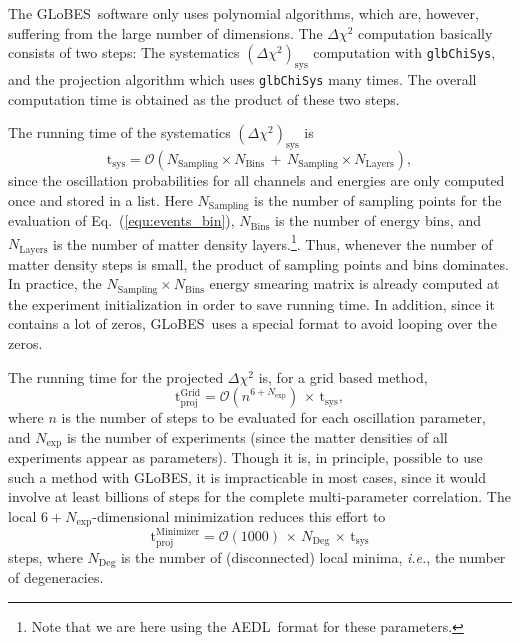 \documentclass[12pt,a4paper]{article}
\newcommand{\ie}{{\it i.e.}}
\newcommand{\eq}{Eq.}
\newcommand{\GLOBES}{{\sf GLoBES}}
\newcommand{\AEDL}{{\sf AEDL}}
\newcommand{\equ}[1]{\eq~(\ref{equ:#1})}
\begin{document}
The \GLOBES\ software only uses polynomial algorithms, which are,
however, suffering from the large number of dimensions.
The $\Delta \chi^2$ computation basically consists of two steps:
The systematics $(\Delta \chi^2)_{\mathrm{sys}}$ computation with {\tt glbChiSys},
and the projection algorithm which uses {\tt glbChiSys} many times. 
The overall computation time is obtained as the product of these two steps.

The running time of the systematics $(\Delta \chi^2)_{\mathrm{sys}}$ 
is 
\begin{equation}
\mathrm{t_{sys}} = \mathcal{O} \left( N_{\mathrm{Sampling}} \times N_{\mathrm{Bins}}  \, + \, N_{\mathrm{Sampling}} \times N_{\mathrm{Layers}} \right) ,
\end{equation}
since the oscillation probabilities for all channels and energies
are only computed once and stored in a list. Here $N_{\mathrm{Sampling}}$ is the number of sampling points for the evaluation of \equ{events_bin}, $N_{\mathrm{Bins}}$ is the number of energy bins,
and $N_{\mathrm{Layers}}$ is the number of matter density layers.\footnote{Note that we are here using the \AEDL\ format for these
parameters.}. Thus, whenever the
number of matter density steps is small, the product of sampling points
and bins dominates. In practice, the $N_{\mathrm{Sampling}} \times N_{\mathrm{Bins}}$ energy smearing matrix is already computed at 
the experiment initialization in order to save running time. In addition,
since it contains a lot of zeros, \GLOBES\ uses a special format to
avoid looping over the zeros.

The running time for the projected $\Delta \chi^2$ is, for a grid based method,
\begin{equation}
 \mathrm{t_{proj}^{Grid}} = \mathcal{O}\left( n^{6+N_{\mathrm{exp}}}\right) \, \times \, \mathrm{t_{sys}},
\end{equation}
where $n$ is the number of steps to be evaluated for each oscillation
parameter, and $N_{\mathrm{exp}}$ is the number of experiments
(since the matter densities of all experiments appear as parameters). 
Though it is, in principle, possible to use such a method with \GLOBES ,
it is impracticable in most cases, since it would involve at least 
billions of
steps for the complete multi-parameter correlation. The local $6+N_{\mathrm{exp}}$-dimensional minimization reduces this effort
to 
\begin{equation}
\mathrm{t_{proj}^{Minimizer}} = \mathcal{O}(1000) \, \times \,
N_{\mathrm{Deg}} \,  \times \, \mathrm{t_{sys}}
\end{equation}
steps, where $N_{\mathrm{Deg}}$ is the number of (disconnected) 
local minima, \ie, the number of
degeneracies.
\end{document}
